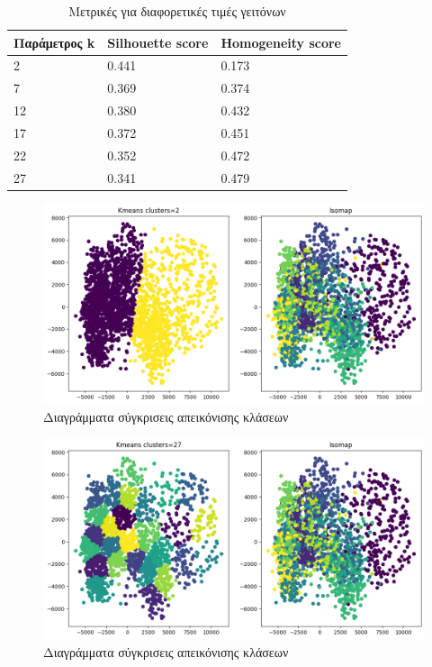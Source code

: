 \begin{table}[ht]
	\centering
	\caption{Μετρικές για διαφορετικές τιμές γειτόνων}
	\begin{tabular}{l | l | l}
		Παράμετρος k & Silhouette score &  Homogeneity score\\
		\hline
		2 & 0.441 & 0.173\\
		7 & 0.369 & 0.374\\
		12 & 0.380&0.432\\
		17 & 0.372 & 0.451\\
		22 &0.352 & 0.472\\
		27 & 0.341 & 0.479\\
	\end{tabular}
	
	\label{tab:abc2}
\end{table}
\begin{figure}[ht]
	\centering
	\includegraphics[width=1\linewidth]{Imagedata1/k_2isomap.png}
	\caption{ Διαγράμματα σύγκρισεις απεικόνισης κλάσεων }
	\label{f:g8}	
\end{figure}
\begin{figure}[ht]
	\centering
	\includegraphics[width=1\linewidth]{Imagedata1/k_27isomap.png}
	\caption{ Διαγράμματα σύγκρισεις απεικόνισης κλάσεων }
	\label{f:g9}	
\end{figure}
\clearpage

